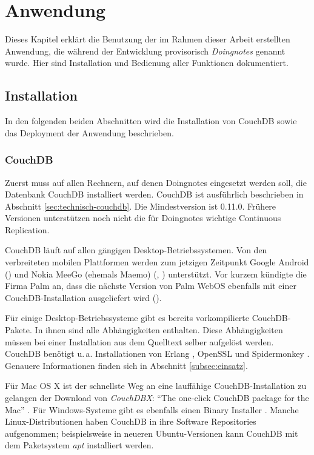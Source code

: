 \chapter{Anwendung}
\label{chap:anwendung}

Dieses Kapitel erklärt die Benutzung der im Rahmen dieser Arbeit erstellten Anwendung, die während der Entwicklung provisorisch \textit{Doingnotes} genannt wurde. Hier sind Installation und Bedienung aller Funktionen dokumentiert. 

\section{Installation}
\label{sec:installation}

In den folgenden beiden Abschnitten wird die Installation von CouchDB sowie das Deployment der Anwendung beschrieben.

\subsection{CouchDB}

Zuerst muss auf allen Rechnern, auf denen Doingnotes eingesetzt werden soll, die Datenbank CouchDB installiert werden. CouchDB ist ausführlich beschrieben in Abschnitt \ref{sec:technisch-couchdb}. Die Mindestversion ist 0.11.0. Frühere Versionen unterstützen noch nicht die für Doingnotes wichtige Continuous Replication.

CouchDB läuft auf allen gängigen Desktop-Betriebssystemen. Von den verbreiteten mobilen Plattformen werden zum jetzigen Zeitpunkt Google Android (\cite{couchmobile:android}) und Nokia MeeGo (ehemals Maemo) (\cite{couchmobile:nokia1}, \cite{couchmobile:nokia2}) unterstützt. Vor kurzem kündigte die Firma Palm an, dass die nächste Version von Palm WebOS ebenfalls mit einer CouchDB-Installation ausgeliefert wird (\cite{couchmobile:webos}).

Für einige Desktop-Betriebssysteme gibt es bereits vorkompilierte CouchDB-Pakete. In ihnen sind alle Abhängigkeiten enthalten. Diese Abhängigkeiten müssen bei einer Installation aus dem Quelltext selber aufgelöst werden. CouchDB benötigt u.\,a. Installationen von Erlang \cite{erlang:homepage}, OpenSSL \cite{openssl} und Spidermonkey \cite{spidermonkey}. Genauere Informationen finden sich in Abschnitt \ref{subsec:einsatz}.

Für Mac OS X ist der schnellste Weg an eine lauffähige CouchDB-Installation zu gelangen der Download von \textit{CouchDBX}: \enquote{The one-click CouchDB package for the Mac} \cite{couch:couchdbx}. Für Windows-Systeme gibt es ebenfalls einen Binary Installer \cite{couch:windows}. Manche Linux-Distributionen haben CouchDB in ihre Software Repositories aufgenommen; beispielsweise in neueren Ubuntu-Versionen kann CouchDB mit dem Paketsystem \textit{apt} installiert werden. 

